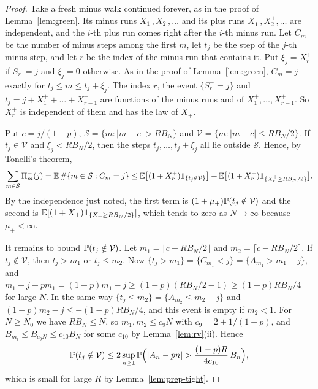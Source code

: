 \begin{proof}
Take a fresh minus walk continued forever, as in the proof of
Lemma~\ref{lem:green}. Its minus runs $X^\minus_1,X^\minus_2,\dots$ and its plus runs
$X^\plus_1,X^\plus_2,\dots$ are independent, and the $i$-th plus run comes right after
the $i$-th minus run. Let $C_m$ be the number of minus steps among the first $m$, let
$t_j$ be the step of the $j$-th minus step, and let $r$ be the index of the minus run
that contains it. Put $\xi_j=X^\plus_r$ if $S^\minus_r=j$ and $\xi_j=0$ otherwise. As
in the proof of Lemma~\ref{lem:green}, $C_m=j$ exactly for $t_j\le m\le t_j+\xi_j$.
The index $r$, the event $\{S^\minus_r=j\}$ and $t_j=j+X^\plus_1+\dots+X^\plus_{r-1}$
are functions of the minus runs and of $X^\plus_1,\dots,X^\plus_{r-1}$. So $X^\plus_r$
is independent of them and has the law of $X_\plus$.

Put $c=j/(1-p)$, $\mathcal S=\{m:|m-c|>RB_N\}$ and $\mathcal V=\{m:|m-c|\le RB_N/2\}$.
If $t_j\in\mathcal V$ and $\xi_j<RB_N/2$, then the steps $t_j,\dots,t_j+\xi_j$ all lie
outside $\mathcal S$. Hence, by Tonelli's theorem,
\[
 \sum_{m\in\mathcal S}\Pi^{-}_m(j)=\mathbb{E}\,\#\{m\in\mathcal S:C_m=j\}
 \le\mathbb{E}\bigl[(1+X^{+}_r)\mathbf{1}_{\{t_j\notin\mathcal V\}}\bigr]+\mathbb{E}\bigl[(1+X^{+}_r)\mathbf{1}_{\{X^{+}_r\ge RB_N/2\}}\bigr].
\]
By the independence just noted, the first term is
$(1+\mu_{+})\mathbb{P}(t_j\notin\mathcal V)$ and the second is
$\mathbb{E}[(1+X_{+})\mathbf{1}_{\{X_{+}\ge RB_N/2\}}]$, which tends to zero as $N\to\infty$
because $\mu_\plus<\infty$.

It remains to bound $\mathbb{P}(t_j\notin\mathcal V)$. Let $m_1=\lfloor c+RB_N/2\rfloor$
and $m_2=\lceil c-RB_N/2\rceil$. If $t_j\notin\mathcal V$, then $t_j>m_1$ or
$t_j\le m_2$. Now $\{t_j>m_1\}=\{C_{m_1}<j\}=\{A_{m_1}>m_1-j\}$, and
$m_1-j-pm_1=(1-p)m_1-j\ge(1-p)(RB_N/2-1)\ge(1-p)RB_N/4$ for large $N$. In the same
way $\{t_j\le m_2\}=\{A_{m_2}\le m_2-j\}$ and $(1-p)m_2-j\le-(1-p)RB_N/4$, and this
event is empty if $m_2<1$. For $N\ge N_0$ we have $RB_N\le N$, so $m_1,m_2\le c_9N$
with $c_9=2+1/(1-p)$, and $B_{m_i}\le B_{c_9N}\le c_{10}B_N$ for some $c_{10}$ by
Lemma~\ref{lem:rv}(ii). Hence
\[
 \Prob(t_j\notin\mathcal V)\le2\sup_{n\ge1}\Prob\Bigl(|A_n-pn|>\frac{(1-p)R}{4c_{10}}\,B_n\Bigr),
\]
which is small for large $R$ by Lemma~\ref{lem:prep-tight}.
\end{proof}

